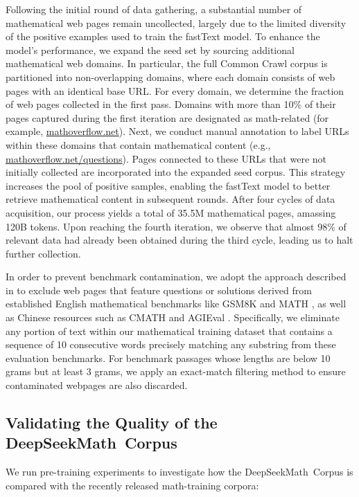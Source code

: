 \begin{itemize}[topsep=0pt]
Following the initial round of data gathering, a substantial number of mathematical web pages remain uncollected, largely due to the limited diversity of the positive examples used to train the fastText model. To enhance the model's performance, we expand the seed set by sourcing additional mathematical web domains. In particular, the full Common Crawl corpus is partitioned into non-overlapping domains, where each domain consists of web pages with an identical base URL. For every domain, we determine the fraction of web pages collected in the first pass. Domains with more than 10\% of their pages captured during the first iteration are designated as math-related (for example, \url{mathoverflow.net}). Next, we conduct manual annotation to label URLs within these domains that contain mathematical content (e.g., \url{mathoverflow.net/questions}). Pages connected to these URLs that were not initially collected are incorporated into the expanded seed corpus. This strategy increases the pool of positive samples, enabling the fastText model to better retrieve mathematical content in subsequent rounds. After four cycles of data acquisition, our process yields a total of 35.5M mathematical pages, amassing 120B tokens. Upon reaching the fourth iteration, we observe that almost 98\% of relevant data had already been obtained during the third cycle, leading us to halt further collection.

In order to prevent benchmark contamination, we adopt the approach described in \cite{deepseek-coder} to exclude web pages that feature questions or solutions derived from established English mathematical benchmarks like GSM8K \citep{gsm8k} and MATH \citep{MATH}, as well as Chinese resources such as CMATH \citep{wei2023cmath} and AGIEval \citep{agieval}. Specifically, we eliminate any portion of text within our mathematical training dataset that contains a sequence of 10 consecutive words precisely matching any substring from these evaluation benchmarks. For benchmark passages whose lengths are below 10 grams but at least 3 grams, we apply an exact-match filtering method to ensure contaminated webpages are also discarded.

\subsection{Validating the Quality of the DeepSeekMath~Corpus}

We run pre-training experiments to investigate how the DeepSeekMath~Corpus is compared with the recently released math-training corpora:


\end{itemize}
